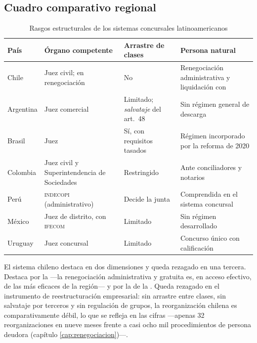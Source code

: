 \bloquePractico

\subsection{Cuadro comparativo regional}

\begin{table}[htbp]
\centering
\footnotesize
\caption{Rasgos estructurales de los sistemas concursales latinoamericanos}
\label{tab:cap27-latam}
\begin{tabularx}{\textwidth}{@{}>{\raggedright\arraybackslash}p{}
                                 >{\raggedright\arraybackslash}p{}
                                 >{\raggedright\arraybackslash}p{} X@{}}
\toprule
\textbf{País} & \textbf{Órgano competente} & \textbf{Arrastre de clases} & \textbf{Persona natural} \\
\midrule
Chile & Juez civil; \superir{} en renegociación & No & Renegociación administrativa y
liquidación con \discharge{} \\
\addlinespace
Argentina & Juez comercial & Limitado; \emph{salvataje} del art.\ 48 & Sin régimen general de
descarga \\
\addlinespace
Brasil & Juez & Sí, con requisitos tasados & Régimen incorporado por la reforma de 2020 \\
\addlinespace
Colombia & Juez civil y Superintendencia de Sociedades & Restringido & Ante conciliadores y
notarios \\
\addlinespace
Perú & \textsc{indecopi} (administrativo) & Decide la junta & Comprendida en el sistema
concursal \\
\addlinespace
México & Juez de distrito, con \textsc{ifecom} & Limitado & Sin régimen desarrollado \\
\addlinespace
Uruguay & Juez concursal & Limitado & Concurso único con calificación \\
\bottomrule
\end{tabularx}
\end{table}


\begin{foco}
El sistema chileno destaca en dos dimensiones y queda rezagado en una tercera. Destaca por la
 ---la renegociación administrativa y gratuita es, en
acceso efectivo, de las más eficaces de la región--- y por la  de la \superir{}. Queda rezagado en el instrumento de reestructuración empresarial:
sin arrastre entre clases, sin salvataje por terceros y sin regulación de grupos, la reorganización
chilena es comparativamente débil, lo que se refleja en las cifras ---apenas 32 reorganizaciones
en nueve meses frente a casi ocho mil procedimientos de persona deudora (capítulo
\ref{cap:renegociacion})---.
\end{foco}
